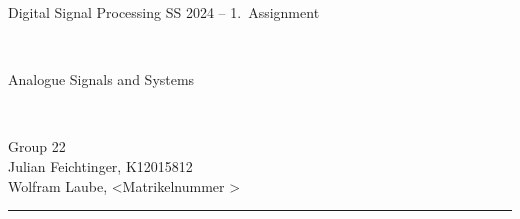 \documentclass[12pt,a4paper,austrian]{article}
\begin{document}
\pagestyle{plain}


\thispagestyle{empty}
\noindent
\begin{minipage}[b][4cm]{1.0\textwidth}
\begin{center}
\begin{bf}
\begin{large} Digital Signal Processing SS 2024 -- 1.~Assignment\end{large} \\
\vspace{0.3cm}
\begin{Large} Analogue Signals and Systems  \end{Large} \\
\vspace{0.3cm}
\end{bf}
\begin{large}
Group 22\\
Julian Feichtinger, K12015812\\
Wolfram Laube, \textless Matrikelnummer \textgreater\\
\end{large}
\end{center}
\end{minipage}

\noindent \rule[0.8em]{\textwidth}{0.12mm}\\[-0.5em]
\end{document}
